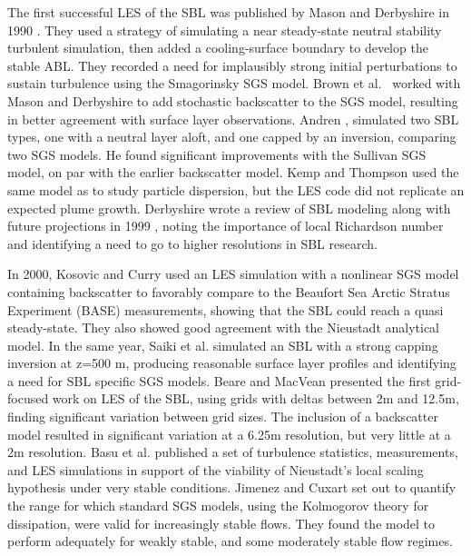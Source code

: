 \documentclass[conf]{new-aiaa}
\begin{document}
The first successful LES of the SBL was published by Mason and Derbyshire in
1990 \cite{Mason1990}. They used a strategy of simulating a near steady-state
neutral stability turbulent simulation, then added a cooling-surface boundary
to develop the stable ABL. They recorded a need for implausibly strong initial
perturbations to sustain turbulence using the Smagorinsky SGS model. Brown et
al.\ \cite{Brown1994} worked with Mason and Derbyshire to add stochastic backscatter
to the SGS model, resulting in better agreement with surface layer observations.
Andren \cite{Andren1995}, simulated two SBL types, one with a neutral layer aloft, and
one capped by an inversion, comparing two SGS models. He found significant improvements
with the Sullivan SGS model, on par with the earlier backscatter model. Kemp and
Thompson \cite{Kemp1996} used the same model as \cite{Brown1994} to study particle
dispersion, but the LES code did not replicate an expected plume growth. Derbyshire
wrote a review of SBL modeling along with future projections in 1999 \cite{Derbyshire1999},
noting the importance of local Richardson number and identifying a need to go
to higher resolutions in SBL research.

In 2000, Kosovic and Curry \cite{Kosovic2000} used an LES simulation
with a nonlinear SGS model containing backscatter to favorably compare
to the Beaufort Sea Arctic Stratus Experiment (BASE) measurements,
showing that the SBL could reach a quasi steady-state. They also
showed good agreement with the Nieustadt analytical model. In the same
year, Saiki et al. \cite{Saiki2000} simulated an SBL with
a strong capping inversion at z=500 m, producing reasonable surface layer profiles and
identifying a need for SBL specific SGS models. Beare and MacVean \cite{Beare2004}
presented the first grid-focused work on LES of the SBL, using grids with deltas
between 2m and 12.5m, finding significant variation between grid sizes. The inclusion
of a backscatter model resulted in significant variation at a 6.25m resolution, but
very little at a 2m resolution. Basu et al. \cite{Basu2005} published a set of
turbulence statistics, measurements, and LES simulations in support
of the viability of Nieustadt's local scaling hypothesis under very stable
conditions. Jimenez and Cuxart \cite{Jimenez2005} set out to quantify the range
for which standard SGS models, using the Kolmogorov theory for dissipation, were
valid for increasingly stable flows. They found the model to perform adequately
for weakly stable, and some moderately stable flow regimes.
\end{document}
